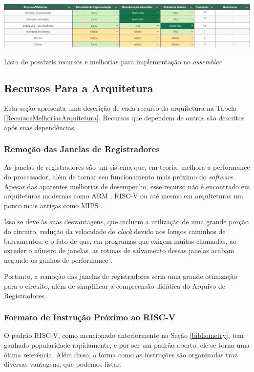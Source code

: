 \documentclass[
	12pt,				%
	openright,			%
	oneside,			%
	a4paper,			%
	english,			%
	french,				%
	spanish,			%
	brazil,				%
	]{abntex2}
\begin{document}
\begin{table}[h]
    \centering
    \includegraphics[width=1\linewidth]{RecursosMelhoriasAssembler.png}
    \caption{Lista de possíveis recursos e melhorias para implementação no \textit{assembler}}
    \label{RecursosMelhoriasAssembler}
\end{table}

\subsection{Recursos Para a Arquitetura}
Esta seção apresenta uma descrição de cada recurso da arquitetura na Tabela \ref{RecursosMelhoriasArquitetura}. Recursos que dependem de outros são descritos após suas dependências.

\subsubsection{Remoção das Janelas de Registradores}\label{recursos_remocao}%
As janelas de registradores são um sistema que, em teoria, melhora a performance do processador, além de tornar seu funcionamento mais próximo do \textit{software}. Apesar das aparentes melhorias de desempenho, esse recurso não é encontrado em arquiteturas modernas como ARM \cite{arm_arm_2014}, RISC-V \cite{risc-v_risc-v_2024} ou até mesmo em arquiteturas um pouco mais antigas como MIPS \cite{mips_tech_llc_mips32_2016}.

Isso se deve às suas desvantagens, que incluem a utilização de uma grande porção do circuito, redução da velocidade de \textit{clock} devido aos longos caminhos de barramentos, e o fato de que, em programas que exigem muitas chamadas, ao exceder o número de janelas, as rotinas de salvamento dessas janelas acabam negando os ganhos de performance \cite{patterson_reduced_1985}.

Portanto, a remoção das janelas de registradores seria uma grande otimização para o circuito, além de simplificar a compreensão didática do Arquivo de Registradores.

\subsubsection{Formato de Instrução Próximo ao RISC-V}\label{recursos_risc-v}%
O padrão RISC-V, como mencionado anteriormente na Seção \ref{bibliometry}, tem ganhado popularidade rapidamente, e por ser um padrão aberto, ele se torna uma ótima referência. Além disso, a forma como as instruções são organizadas traz diversas vantagens, que podemos listar:
\end{document}
